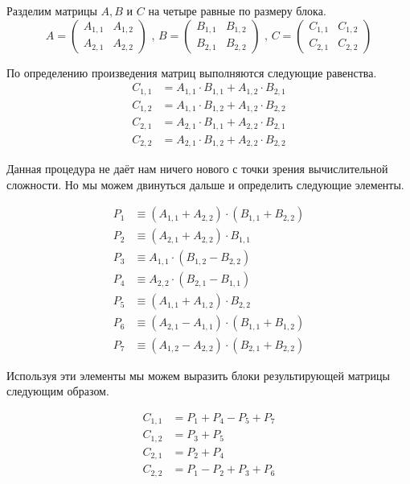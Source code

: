 Разделим матрицы $A, B$ и $C$ на четыре равные по размеру блока.
$$
	A =
	\begin{pmatrix}
		A_{1,1} & A_{1,2} \\
		A_{2,1} & A_{2,2}
	\end{pmatrix} \mbox{ , }
	B =
	\begin{pmatrix}
		B_{1,1} & B_{1,2} \\
		B_{2,1} & B_{2,2}
	\end{pmatrix} \mbox{ , }
	C =
	\begin{pmatrix}
		C_{1,1} & C_{1,2} \\
		C_{2,1} & C_{2,2}
	\end{pmatrix}
$$

По определению произведения матриц выполняются следующие равенства.
\begin {align*}
C_{1,1}&= A_{1,1} \cdot B_{1,1} + A_{1,2} \cdot B_{2,1} \\
C_{1,2}&= A_{1,1} \cdot B_{1,2} + A_{1,2} \cdot B_{2,2} \\
C_{2,1}&= A_{2,1} \cdot B_{1,1} + A_{2,2} \cdot B_{2,1} \\
C_{2,2}&= A_{2,1} \cdot B_{1,2} + A_{2,2} \cdot B_{2,2}
\end {align*}

Данная процедура не даёт нам ничего нового с точки зрения вычислительной сложности. Но мы можем двинуться дальше и определить следующие элементы.

\begin {align*}
P_1 & \equiv (A_{1,1} + A_{2,2}) \cdot (B_{1,1} + B_{2,2}) \\
P_2 & \equiv (A_{2,1} + A_{2,2}) \cdot B_{1,1} \\
P_3 & \equiv A_{1,1} \cdot (B_{1,2} - B_{2,2}) \\
P_4 & \equiv A_{2,2} \cdot (B_{2,1} - B_{1,1}) \\
P_5 & \equiv (A_{1,1} + A_{1,2}) \cdot B_{2,2}  \\
P_6 & \equiv (A_{2,1} - A_{1,1}) \cdot (B_{1,1} + B_{1,2}) \\
P_7 & \equiv (A_{1,2} - A_{2,2}) \cdot (B_{2,1} + B_{2,2})
\end {align*}

Используя эти элементы мы можем выразить блоки результирующей матрицы следующим образом.

\begin {align*}
C_{1,1} & = P_1 + P_4 - P_5 + P_7 \\
C_{1,2} & = P_3 + P_5 \\
C_{2,1} & = P_2 + P_4 \\
C_{2,2} & = P_1 - P_2 + P_3 + P_6
\end {align*}

